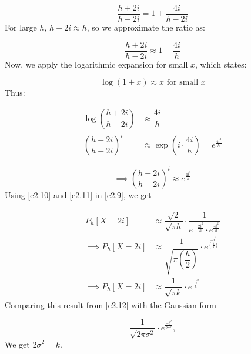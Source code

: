 \begin{equation*}
    \dfrac{h + 2i}{h - 2i} = 1 + \dfrac{4i}{h - 2i}
\end{equation*}
For large $h$, $h - 2i \approx h$, so we approximate the ratio as:

\begin{equation*}
    \dfrac{h + 2i}{h - 2i} \approx 1 + \dfrac{4i}{h}
\end{equation*}
Now, we apply the logarithmic expansion for small $x$, which states:

\begin{equation*}
    \log(1 + x) \approx x \text{ for small } x
\end{equation*}
Thus:

\begin{equation*}
    \begin{aligned}
        \log\left(\dfrac{h + 2i}{h - 2i}\right) &\approx \dfrac{4i}{h} \\
        \left(\dfrac{h + 2i}{h - 2i}\right)^i &\approx
        \exp{\left(i \cdot \dfrac{4i}{h}\right)}
        = e^{\frac{4i^2}{h}}
    \end{aligned}
\end{equation*}

\begin{equation}
    \implies \left(\dfrac{h + 2i}{h - 2i}\right)^i \approx e^{\frac{4i^2}{h}}
    \label{e2.11}
\end{equation}
Using \ref{e2.10} and \ref{e2.11} in \ref{e2.9}, we get

\begin{equation}
    \begin{aligned}
        P_h[X = 2i] &\approx
        \dfrac{\sqrt{2}}{\sqrt{\pi h}} \cdot
        \dfrac{1}{e^{-\frac{2i^2}{h}} \cdot
        e^{\frac{4i^2}{h}}} \\
        \implies P_h[X = 2i] &\approx
        \dfrac{1}{\sqrt{\pi \left(\dfrac{h}{2}\right)}} \cdot
        e^{\frac{-i^2}{\left(\frac{h}{2}\right)}} \\
        \implies P_h[X = 2i] &\approx
        \dfrac{1}{\sqrt{\pi k}} \cdot
        e^{\frac{-i^2}{k}}
    \end{aligned}
    \label{e2.12}
\end{equation}
Comparing this result from \ref{e2.12} with the Gaussian form

\begin{equation*}
        \dfrac{1}{\sqrt{2 \pi \sigma^2}} \cdot e^{\frac{-i^2}{2 \sigma^2}},
\end{equation*}
We get $2\sigma^2 = k$.

